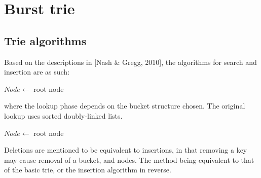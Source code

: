 \documentclass[11pt,a4paper]{article}
\begin{document}
\newpage
\section{Burst trie}
\subsection{Trie algorithms}
Based on the descriptions in [Nash \& Gregg, 2010], the algorithms for search
and insertion are as such:

\begin{algorithm}[H]
    \caption{$k$\FuncSty{)}}
    \label{alg:bt_search}

    $Node \leftarrow$  root node\;
\end{algorithm}

where the lookup phase depends on the bucket structure chosen. The original
lookup uses sorted doubly-linked lists. 

\begin{algorithm}[H]
    \caption{$k$\FuncSty{)}}
    \label{alg:bt_insert}


    $Node \leftarrow$  root node\;
\end{algorithm}

Deletions are mentioned to be equivalent to insertions, in that removing a key
may cause removal of a bucket, and nodes. The method being equivalent to that
of the basic trie, or the insertion algorithm in reverse.

\begin{algorithm}[H]
    \caption{$b$\FuncSty{)}}
    \label{alg:bt_burst}

\end{algorithm}
\end{document}
